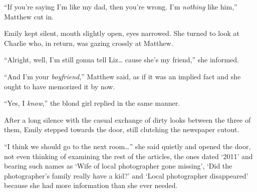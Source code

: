 “If you're saying I'm like my dad, then you're wrong. I'm \textit{nothing} like him,” Matthew cut in.

Emily kept silent, mouth slightly open, eyes narrowed. She turned to look at Charlie who, in return, was gazing crossly at Matthew.

“Alright, well, I'm still gonna tell Liz… cause she's my friend,” she informed.

“And I'm your \textit{boyfriend},” Matthew said, as if it was an implied fact and she ought to have memorized it by now.

“Yes, I \textit{know},” the blond girl replied in the same manner.

After a long silence with the casual exchange of dirty looks between the three of them, Emily stepped towards the door, still clutching the newspaper cutout.

“I think we should go to the next room…” she said quietly and opened the door, not even thinking of examining the rest of the articles, the ones dated ‘2011' and bearing such names as ‘Wife of local photographer gone missing', ‘Did the photographer's family really have a kid?' and ‘Local photographer disappeared' because she had more information than she ever needed.